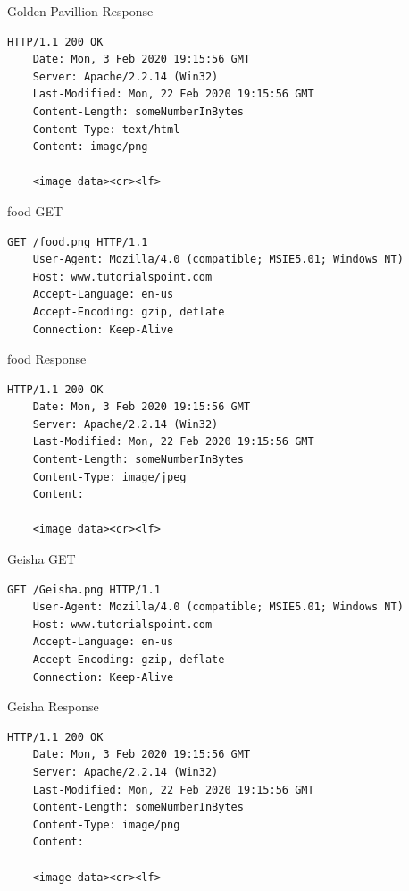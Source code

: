 \documentclass[12pt,addpoints,answers]{exam}
\begin{document}
\begin{questions}
\begin{solution}
	Golden Pavillion Response
	\begin{minipage}{\textwidth}
	\begin{lstlisting}[language={},escapechar=§,basicstyle=\ttfamily,breaklines=true]
	HTTP/1.1 200 OK
	Date: Mon, 3 Feb 2020 19:15:56 GMT
	Server: Apache/2.2.14 (Win32)
	Last-Modified: Mon, 22 Feb 2020 19:15:56 GMT
	Content-Length: someNumberInBytes
	Content-Type: text/html
	Content: image/png
	
	<image data><cr><lf>
	\end{lstlisting}
	\end{minipage}

	food GET
\begin{minipage}{\textwidth}
	\begin{lstlisting}[language={},escapechar=§,basicstyle=\ttfamily,breaklines=true]
	GET /food.png HTTP/1.1
	User-Agent: Mozilla/4.0 (compatible; MSIE5.01; Windows NT)
	Host: www.tutorialspoint.com
	Accept-Language: en-us
	Accept-Encoding: gzip, deflate
	Connection: Keep-Alive
	\end{lstlisting}
\end{minipage}

	food Response
\begin{minipage}{\textwidth}
	\begin{lstlisting}[language={},escapechar=§,basicstyle=\ttfamily,breaklines=true]
	HTTP/1.1 200 OK
	Date: Mon, 3 Feb 2020 19:15:56 GMT
	Server: Apache/2.2.14 (Win32)
	Last-Modified: Mon, 22 Feb 2020 19:15:56 GMT
	Content-Length: someNumberInBytes
	Content-Type: image/jpeg
	Content:
	
	<image data><cr><lf>
	\end{lstlisting}
\end{minipage}

	Geisha GET
\begin{minipage}{\textwidth}
	\begin{lstlisting}[language={},escapechar=§,basicstyle=\ttfamily,breaklines=true]
	GET /Geisha.png HTTP/1.1
	User-Agent: Mozilla/4.0 (compatible; MSIE5.01; Windows NT)
	Host: www.tutorialspoint.com
	Accept-Language: en-us
	Accept-Encoding: gzip, deflate
	Connection: Keep-Alive
	\end{lstlisting}
\end{minipage}

	Geisha Response
\begin{minipage}{\textwidth}
	\begin{lstlisting}[language={},escapechar=§,basicstyle=\ttfamily,breaklines=true]
	HTTP/1.1 200 OK
	Date: Mon, 3 Feb 2020 19:15:56 GMT
	Server: Apache/2.2.14 (Win32)
	Last-Modified: Mon, 22 Feb 2020 19:15:56 GMT
	Content-Length: someNumberInBytes
	Content-Type: image/png
	Content:
	
	<image data><cr><lf>
	\end{lstlisting}
\end{minipage}
\end{solution}

\end{questions}
\end{document}
